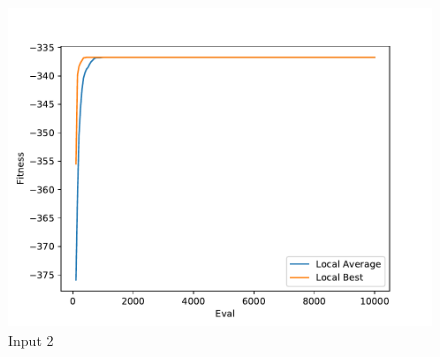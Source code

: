 \documentclass{standalone}
\begin{document}
\begin{figure}[!htb]
	\caption{Input 2}
	\label{fig:graph_2041}
	\includegraphics[width=\textwidth]{../graphs/graphs/2041.pdf}
\end{figure}
\end{document}
